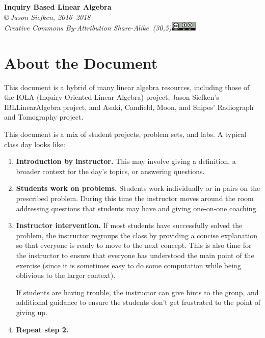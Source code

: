 \documentclass{problemset}
\begin{document}
\begin{center}
{\huge\bf Inquiry Based Linear Algebra}\\

\vspace{.7in}
{
\it \copyright\,Jason Siefken, 2016--2018 \\
Creative Commons By-Attribution Share-Alike\, \makebox(30,5){\includegraphics[height=1.2em]{by-sa.pdf}}
}
\end{center}

\section*{About the Document}

This document is a hybrid of many linear algebra resources, including those of
the IOLA (Inquiry Oriented Linear Algebra) project, Jason Siefken's
IBLLinearAlgebra project, and Asaki, Camfield, Moon, and Snipes' Radiograph and
Tomography project.

This document is a mix of student projects, problem sets, and labs. A typical
class day looks like:
\begin{enumerate}
	\item {\bf Introduction by instructor.} This may involve giving a definition,
		a broader context for the day's topics, or answering questions.

	\item {\bf Students work on problems.} Students work individually or in pairs
		on the prescribed problem. During this time the instructor moves
		around the room addressing questions that students may have and giving
		one-on-one coaching.

	\item {\bf Instructor intervention.} If most students have successfully solved
		the problem, the instructor regroups the class by providing a concise
		explanation so that everyone is ready to move to the next concept.
		This is also time for the instructor to ensure that everyone has
		understood the main point of the exercise (since it is sometimes
		easy to do some computation while being oblivious to the larger context).

		If students are having trouble, the instructor can give hints to
		the group, and additional guidance to ensure the students don't get
		frustrated to the point of giving up.

	\item {\bf Repeat step 2.}
\end{enumerate}
\end{document}
